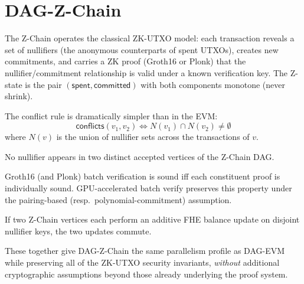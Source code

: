 \section{DAG-Z-Chain}

\label{sec:dagzchain}

The Z-Chain operates the classical ZK-UTXO model: each transaction reveals
a set of nullifiers (the anonymous counterparts of spent UTXOs), creates
new commitments, and carries a ZK proof (Groth16 or Plonk) that the
nullifier/commitment relationship is valid under a known verification
key. The Z-state is the pair $(\mathsf{spent}, \mathsf{committed})$ with
both components monotone (never shrink).

The conflict rule is dramatically simpler than in the EVM:
\[
\mathsf{conflicts}(v_1, v_2) \iff N(v_1) \cap N(v_2) \neq \emptyset
\]
where $N(v)$ is the union of nullifier sets across the transactions of $v$.

\begin{theorem}
No nullifier appears in two distinct accepted vertices of the Z-Chain DAG.
\end{theorem}

\begin{theorem}
Groth16 (and Plonk) batch verification is sound iff each constituent proof
is individually sound. GPU-accelerated batch verify preserves this property
under the pairing-based (resp.\ polynomial-commitment) assumption.
\end{theorem}

\begin{theorem}
If two Z-Chain vertices each perform an additive FHE balance update on
disjoint nullifier keys, the two updates commute.
\end{theorem}

These together give DAG-Z-Chain the same parallelism profile as DAG-EVM
while preserving all of the ZK-UTXO security invariants, \emph{without}
additional cryptographic assumptions beyond those already underlying the
proof system.

